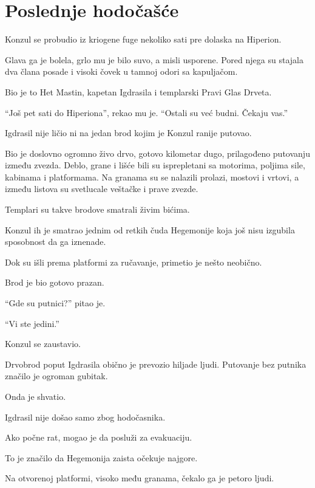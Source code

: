 \chapter{Poslednje hodočašće}


Konzul se probudio iz kriogene fuge nekoliko sati pre dolaska na Hiperion.

Glava ga je bolela, grlo mu je bilo suvo, a misli usporene. Pored njega su stajala dva člana posade i visoki čovek u tamnoj odori sa kapuljačom.

Bio je to Het Mastin, kapetan Igdrasila i templarski Pravi Glas Drveta.

``Još pet sati do Hiperiona'', rekao mu je. ``Ostali su već budni. Čekaju vas.''

Igdrasil nije ličio ni na jedan brod kojim je Konzul ranije putovao.

Bio je doslovno ogromno živo drvo, gotovo kilometar dugo, prilagođeno putovanju između zvezda. Deblo, grane i lišće bili su isprepletani sa motorima, poljima sile, kabinama i platformama. Na granama su se nalazili prolazi, mostovi i vrtovi, a između listova su svetlucale veštačke i prave zvezde.

Templari su takve brodove smatrali živim bićima.

Konzul ih je smatrao jednim od retkih čuda Hegemonije koja još nisu izgubila sposobnost da ga iznenade.

Dok su išli prema platformi za ručavanje, primetio je nešto neobično.

Brod je bio gotovo prazan.

``Gde su putnici?'' pitao je.

``Vi ste jedini.''

Konzul se zaustavio.

Drvobrod poput Igdrasila obično je prevozio hiljade ljudi. Putovanje bez putnika značilo je ogroman gubitak.

Onda je shvatio.

Igdrasil nije došao samo zbog hodočasnika.

Ako počne rat, mogao je da posluži za evakuaciju.

To je značilo da Hegemonija zaista očekuje najgore.

Na otvorenoj platformi, visoko među granama, čekalo ga je petoro ljudi.

